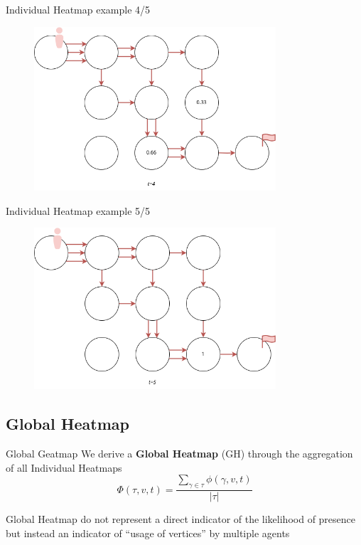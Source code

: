 \begin{frame}{Individual Heatmap example 4/5}
    \begin{figure}[H]
        \centering
        \includegraphics[width=9cm]{img/individual_heatmap_p4.drawio.png}
    \end{figure}
\end{frame}

\begin{frame}{Individual Heatmap example 5/5}
    \begin{figure}[H]
        \centering
        \includegraphics[width=9cm]{img/individual_heatmap_p5.drawio.png}
    \end{figure}
\end{frame}

\subsection{Global Heatmap}

\begin{frame}{Global Geatmap}
    We derive a \textbf{Global Heatmap} (GH) through the aggregation of all Individual Heatmaps
    \[
        \Phi(\tau,v,t) = \frac{ \sum_{\gamma \in \tau}\phi(\gamma,v,t)}{|\tau|}
    \]

    Global Heatmap do not represent a direct indicator of the likelihood of presence but instead an indicator of ``usage of vertices'' by multiple agents
\end{frame}



